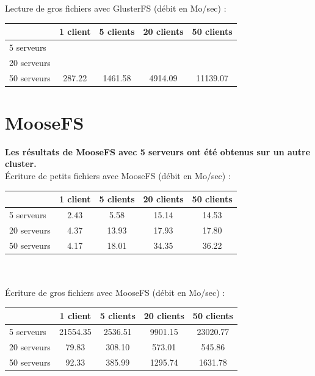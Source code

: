 \documentclass[12pt]{report}
\begin{document}
			Lecture de gros fichiers avec GlusterFS (débit en Mo/sec) :

			\begin{tabular}{|l|c|c|c|c|}
				\hline
				& 1 client & 5 clients & 20 clients & 50 clients \\
				\hline
				5 serveurs & & & & \\
				\hline
				20 serveurs & & & & \\
				\hline
				50 serveurs & 287.22 & 1461.58 & 4914.09 & 11139.07 \\
				\hline
			\end{tabular}

			\newpage

			\section{MooseFS}

			\textbf{Les résultats de MooseFS avec 5 serveurs ont été obtenus sur un autre cluster.}\\

			Écriture de petits fichiers avec MooseFS (débit en Mo/sec) :

			\begin{tabular}{|l|c|c|c|c|}
				\hline
				& 1 client & 5 clients & 20 clients & 50 clients \\
				\hline
				5 serveurs & 2.43 & 5.58 & 15.14 & 14.53 \\
				\hline
				20 serveurs & 4.37 & 13.93 & 17.93 & 17.80 \\
				\hline
				50 serveurs & 4.17 & 18.01 & 34.35 & 36.22 \\
				\hline
			\end{tabular}\\\\

			Écriture de gros fichiers avec MooseFS (débit en Mo/sec) :

			\begin{tabular}{|l|c|c|c|c|}
				\hline
				& 1 client & 5 clients & 20 clients & 50 clients \\
				\hline
				5 serveurs & 21554.35 & 2536.51 & 9901.15 & 23020.77 \\
				\hline
				20 serveurs & 79.83 & 308.10 & 573.01 & 545.86 \\
				\hline
				50 serveurs & 92.33 & 385.99 & 1295.74 & 1631.78 \\
				\hline
			\end{tabular}\\\\
\end{document}
